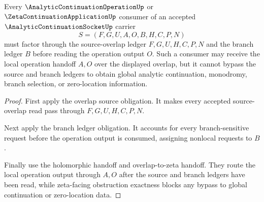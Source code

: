 \begin{theorem}
\label{thm:analytic-continuation-socket-operation-handoff-obligation}
Every $\AnalyticContinuationOperationUp$ or $\ZetaContinuationApplicationUp$ consumer of an accepted $\AnalyticContinuationSocketUp$ carrier
$$
S=(F,G,U,A,O,B,H,C,P,N)
$$
must factor through the source-overlap ledger $F,G,U,H,C,P,N$ and the branch ledger $B$ before reading the operation output $O$. Such a consumer may receive the local operation handoff $A,O$ over the displayed overlap, but it cannot bypass the source and branch ledgers to obtain global analytic continuation, monodromy, branch selection, or zero-location information.
\end{theorem}
\begin{proof}
First apply the overlap source obligation. It makes every accepted source-overlap read pass through $F,G,U,H,C,P,N$.

Next apply the branch ledger obligation. It accounts for every branch-sensitive request before the operation output is consumed, assigning nonlocal requests to $B$.

Finally use the holomorphic handoff and overlap-to-zeta handoff. They route the local operation output through $A,O$ after the source and branch ledgers have been read, while zeta-facing obstruction exactness blocks any bypass to global continuation or zero-location data.
\end{proof}

